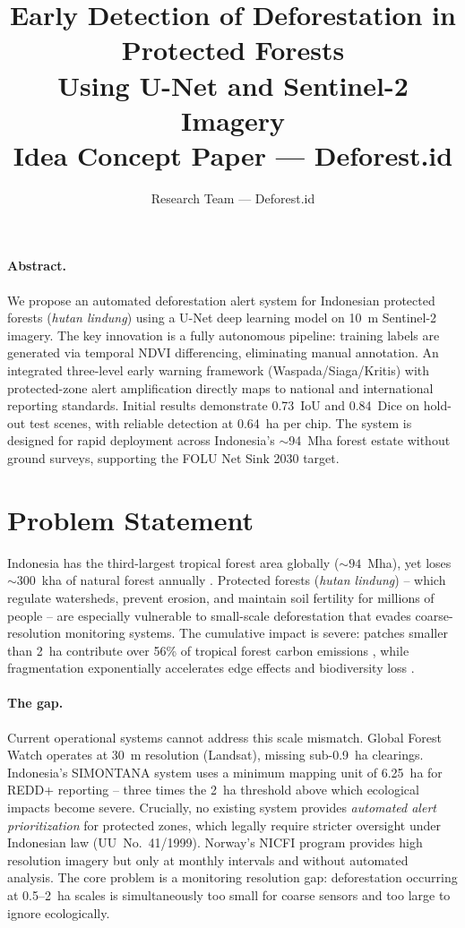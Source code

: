 \documentclass[10pt,a4paper,onecolumn]{article}
\title{\textbf{Early Detection of Deforestation in Protected Forests \\
Using U-Net and Sentinel-2 Imagery} \\
\small Idea Concept Paper --- Deforest.id}
\author{Research Team --- Deforest.id}
\date{}
\begin{document}
\maketitle
\thispagestyle{empty}

\paragraph{Abstract.}
We propose an automated deforestation alert system for Indonesian
protected forests (\textit{hutan lindung}) using a U-Net deep
learning model on 10~m Sentinel-2 imagery. The key innovation is
a fully autonomous pipeline: training labels are generated via
temporal NDVI differencing, eliminating manual annotation. An
integrated three-level early warning framework (Waspada/Siaga/Kritis)
with protected-zone alert amplification directly maps to national
and international reporting standards. Initial results demonstrate
0.73~IoU and 0.84~Dice on hold-out test scenes, with reliable
detection at 0.64~ha per chip. The system is designed for rapid
deployment across Indonesia's $\sim$94~Mha forest estate without
ground surveys, supporting the FOLU Net Sink 2030 target.

\section{Problem Statement}
Indonesia has the third-largest tropical forest area globally
($\sim94$~Mha), yet loses $\sim300$~kha of natural forest annually
\cite{fao2022sofo}. Protected forests (\textit{hutan lindung}) --
which regulate watersheds, prevent erosion, and maintain soil
fertility for millions of people -- are especially vulnerable to
small-scale deforestation that evades coarse-resolution monitoring
systems. The cumulative impact is severe: patches smaller than
2~ha contribute over 56\% of tropical forest carbon emissions
\cite{xu2026nature}, while fragmentation exponentially accelerates
edge effects and biodiversity loss \cite{taubert2018fragmentation}.

\paragraph{The gap.}
Current operational systems cannot address this scale mismatch.
Global Forest Watch operates at 30~m resolution (Landsat), missing
sub-0.9~ha clearings. Indonesia's SIMONTANA system uses a minimum
mapping unit of 6.25~ha for REDD+ reporting
\cite{unfccc2022indonesia} -- three times the 2~ha threshold above
which ecological impacts become severe. Crucially, no existing
system provides \textit{automated alert prioritization} for
protected zones, which legally require stricter oversight under
Indonesian law (UU~No.~41/1999). Norway's NICFI program provides
high resolution imagery but only at monthly intervals and without
automated analysis. The core problem is a monitoring resolution
gap: deforestation occurring at 0.5--2~ha scales is simultaneously
too small for coarse sensors and too large to ignore ecologically.
\end{document}
